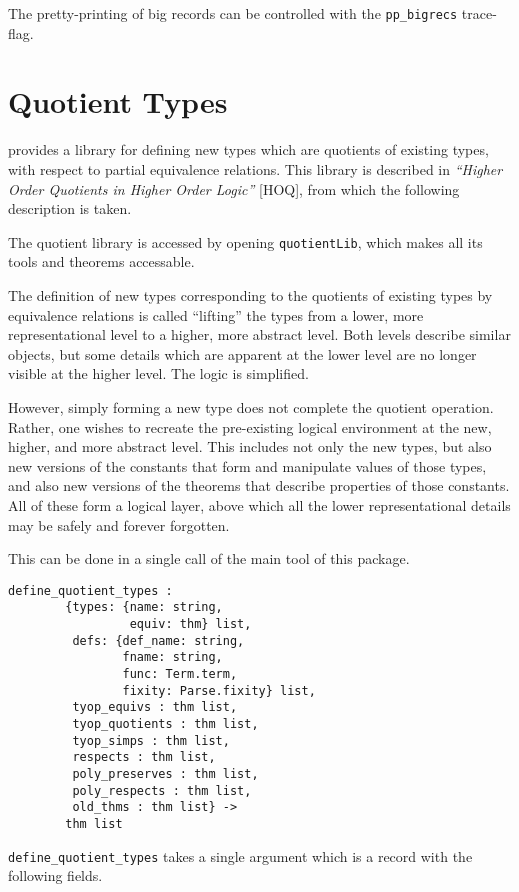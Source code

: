 The pretty-printing of big records can be controlled with the
\texttt{pp\_bigrecs} trace-flag.


\section{Quotient Types}\label{quotients}

\HOL{} provides a library for defining new types which are quotients
of existing types, with respect to partial equivalence relations.
This library is described in {\it ``Higher Order Quotients in Higher
Order Logic''} [HOQ], from which the following description is taken.

The quotient library is accessed by opening {\tt quotientLib},
which makes all its tools and theorems accessable.

The definition of new types corresponding to the quotients of
existing types by equivalence relations is called ``lifting''
the types from a lower, more representational level to a higher,
more abstract level.  Both levels describe similar objects, but
some details which are apparent at the lower level are no longer
visible at the higher level.  The logic is simplified.

However, simply forming a new type does not complete the quotient operation.
Rather, one wishes to recreate the
pre-existing logical environment at the new,
higher, and more abstract level.  This includes not only the new
types, but also new versions of the constants that form and
manipulate values of those types, and also new versions of the
theorems that describe properties of those constants.  All of these
form a logical layer, above which all the lower representational details
may be safely and forever forgotten.

This can be done in a single call of the
main tool of this package.

\begin{hol}
\begin{verbatim}
define_quotient_types :
        {types: {name: string,
                 equiv: thm} list,
         defs: {def_name: string,
                fname: string,
                func: Term.term,
                fixity: Parse.fixity} list,
         tyop_equivs : thm list,
         tyop_quotients : thm list,
         tyop_simps : thm list,
         respects : thm list,
         poly_preserves : thm list,
         poly_respects : thm list,
         old_thms : thm list} ->
        thm list
\end{verbatim}
\end{hol}
{\tt define\_quotient\_types} takes a single argument which is a
record with the following fields.

